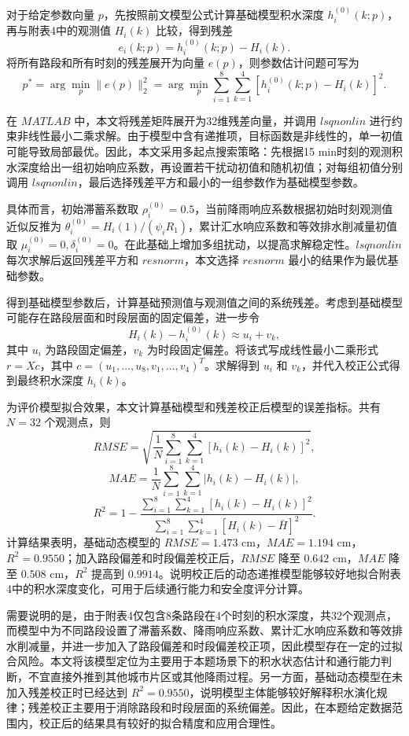 \documentclass[UTF8,a4paper,12pt]{ctexart}
\begin{document}
对于给定参数向量 \(p\)，先按照前文模型公式计算基础模型积水深度 \(h_i^{(0)}(k;p)\)，再与附表4中的观测值 \(H_i(k)\) 比较，得到残差
\[
e_i(k;p)=h_i^{(0)}(k;p)-H_i(k).
\]
将所有路段和所有时刻的残差展开为向量 \(e(p)\)，则参数估计问题可写为
\[
p^\ast=\arg\min_p \|e(p)\|_2^2
=\arg\min_p\sum_{i=1}^{8}\sum_{k=1}^{4}
\left[h_i^{(0)}(k;p)-H_i(k)\right]^2.
\]

在 $MATLAB$ 中，本文将残差矩阵展开为32维残差向量，并调用 $lsqnonlin$ 进行约束非线性最小二乘求解。由于模型中含有递推项，目标函数是非线性的，单一初值可能导致局部最优。因此，本文采用多起点搜索策略：先根据15 min时刻的观测积水深度给出一组初始响应系数，再设置若干扰动初值和随机初值；对每组初值分别调用 $lsqnonlin$，最后选择残差平方和最小的一组参数作为基础模型参数。

具体而言，初始滞蓄系数取 \(\rho_i^{(0)}=0.5\)，当前降雨响应系数根据初始时刻观测值近似反推为 \(\theta_i^{(0)}=H_i(1)/(\psi_iR_1)\)，累计汇水响应系数和等效排水削减量初值取 \(\mu_i^{(0)}=0,\delta_i^{(0)}=0\)。在此基础上增加多组扰动，以提高求解稳定性。$lsqnonlin$ 每次求解后返回残差平方和 $resnorm$，本文选择 $resnorm$ 最小的结果作为最优基础参数。

得到基础模型参数后，计算基础预测值与观测值之间的系统残差。考虑到基础模型可能存在路段层面和时段层面的固定偏差，进一步令
\[
H_i(k)-h_i^{(0)}(k)\approx u_i+v_k,
\]
其中 \(u_i\) 为路段固定偏差，\(v_k\) 为时段固定偏差。将该式写成线性最小二乘形式 \(r=Xc\)，其中 \(c=(u_1,\ldots,u_8,v_1,\ldots,v_4)^T\)。求解得到 \(u_i\) 和 \(v_k\)，并代入校正公式得到最终积水深度 \(h_i(k)\)。

为评价模型拟合效果，本文计算基础模型和残差校正后模型的误差指标。共有 \(N=32\) 个观测点，则
\[
RMSE=\sqrt{\frac{1}{N}\sum_{i=1}^{8}\sum_{k=1}^{4}
\left[h_i(k)-H_i(k)\right]^2},
\]
\[
MAE=\frac{1}{N}\sum_{i=1}^{8}\sum_{k=1}^{4}
\left|h_i(k)-H_i(k)\right|,
\]
\[
R^2=1-\frac{\sum_{i=1}^{8}\sum_{k=1}^{4}
\left[h_i(k)-H_i(k)\right]^2}
{\sum_{i=1}^{8}\sum_{k=1}^{4}\left[H_i(k)-\bar H\right]^2}.
\]
计算结果表明，基础动态模型的 \(RMSE=1.473\) cm，\(MAE=1.194\) cm，\(R^2=0.9550\)；加入路段偏差和时段偏差校正后，\(RMSE\) 降至 \(0.642\) cm，\(MAE\) 降至 \(0.508\) cm，\(R^2\) 提高到 \(0.9914\)。说明校正后的动态递推模型能够较好地拟合附表4中的积水深度变化，可用于后续通行能力和安全度评分计算。

需要说明的是，由于附表4仅包含8条路段在4个时刻的积水深度，共32个观测点，而模型中为不同路段设置了滞蓄系数、降雨响应系数、累计汇水响应系数和等效排水削减量，并进一步加入了路段偏差和时段偏差校正项，因此模型存在一定的过拟合风险。本文将该模型定位为主要用于本题场景下的积水状态估计和通行能力判断，不宜直接外推到其他城市片区或其他降雨过程。另一方面，基础动态模型在未加入残差校正时已经达到 \(R^2=0.9550\)，说明模型主体能够较好解释积水演化规律；残差校正主要用于消除路段和时段层面的系统偏差。因此，在本题给定数据范围内，校正后的结果具有较好的拟合精度和应用合理性。
\end{document}
